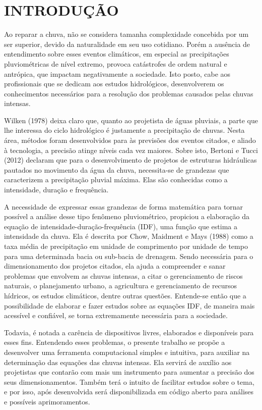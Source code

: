 \onehalfspacing
\chapter{INTRODUÇÃO}

Ao reparar a chuva, não se considera tamanha complexidade concebida por um ser superior, devido da naturalidade em seu uso cotidiano. Porém a ausência de entendimento sobre esses eventos climáticos, em especial as precipitações pluviométricas de nível extremo, provoca catástrofes de ordem natural e antrópica, que impactam negativamente a sociedade. Isto posto, cabe aos profissionais que se dedicam aos estudos hidrológicos, desenvolverem os conhecimentos necessários para a resolução dos problemas causados pelas chuvas intensas.

Wilken (1978) deixa claro que, quanto ao projetista de águas pluviais, a parte que lhe interessa do ciclo hidrológico é justamente a precipitação de chuvas. Nesta área, métodos foram desenvolvidos para às previsões dos eventos citados, e aliado à tecnologia, a precisão atinge níveis cada vez maiores. Sobre isto, Bertoni e Tucci (2012) declaram que para o desenvolvimento de projetos de estruturas hidráulicas pautados no movimento da água da chuva, necessita-se de grandezas que caracterizem a precipitação pluvial máxima. Elas são conhecidas como a intensidade, duração e frequência.

A necessidade de expressar essas grandezas de forma matemática para tornar possível a análise desse tipo fenômeno pluviométrico, propiciou a elaboração da equação de intensidade-duração-frequência (IDF), uma função que estima a intensidade da chuva. Ela é descrita por Chow, Maidment e Mays (1988) como a taxa média de precipitação em unidade de comprimento por unidade de tempo para uma determinada bacia ou sub-bacia de drenagem. Sendo necessária para o dimensionamento dos projetos citados, ela ajuda a compreender e sanar problemas que envolvem as chuvas intensas, a citar o gerenciamento de riscos naturais, o planejamento urbano, a agricultura e gerenciamento de recursos hídricos, os estudos climáticos, dentre outras questões. Entende-se então que a possibilidade de elaborar e fazer estudos sobre as equações IDF, de maneira mais acessível e confiável, se torna extremamente necessária para a sociedade. 

Todavia, é notada a carência de dispositivos livres, elaborados e disponíveis para esses fins. Entendendo esses problemas, o presente trabalho se propõe a desenvolver uma ferramenta computacional simples e intuitiva, para auxiliar na determinação das equações das chuvas intensas. Ela servirá de auxílio aos projetistas que contarão com mais um instrumento para aumentar a precisão dos seus dimensionamentos. Também terá o intuito de facilitar estudos sobre o tema, e por isso, após desenvolvida será disponibilizada em código aberto para análises e possíveis aprimoramentos.
